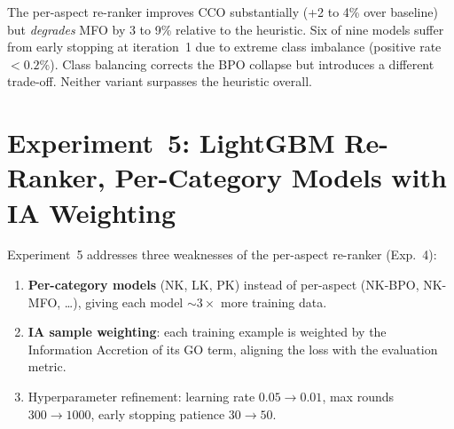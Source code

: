 \begin{table}[htbp]
  \centering
  \caption[Fmax: LightGBM per-aspect re-ranker]{$F_{\max}$: LightGBM per-aspect re-ranker (Exp.~4).}
  \label{tab:results-reranker-pa}
\end{table}

The per-aspect re-ranker improves CCO substantially (+2 to 4\% over baseline) but
\emph{degrades} MFO by 3 to 9\% relative to the heuristic. Six of nine models
suffer from early stopping at iteration~1 due to extreme class imbalance
(positive rate $<0.2\%$). Class balancing corrects the BPO collapse but
introduces a different trade-off. Neither variant surpasses the heuristic
overall.

\section{Experiment~5: LightGBM Re-Ranker, Per-Category Models with IA Weighting}
\label{subsec:exp5-reranker-pc}

Experiment~5 addresses three weaknesses of the per-aspect re-ranker (Exp.~4):
\begin{enumerate}
  \item \textbf{Per-category models} (NK, LK, PK) instead of per-aspect
    (NK-BPO, NK-MFO, \ldots), giving each model ${\sim}3{\times}$ more training data.
  \item \textbf{IA sample weighting}: each training example is weighted by the
    Information Accretion of its GO term, aligning the loss with the evaluation metric.
  \item Hyperparameter refinement: learning rate $0.05 \to 0.01$,
    max rounds $300 \to 1000$, early stopping patience $30 \to 50$.
\end{enumerate}

